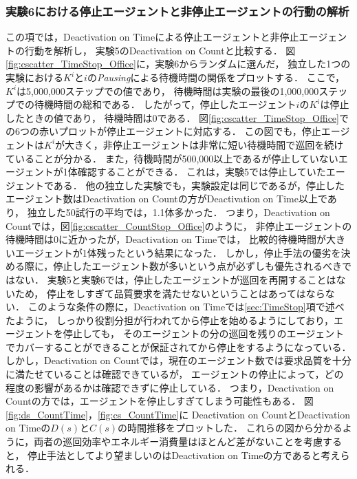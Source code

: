 \documentclass[12pt,a4j,twoside]{jarticle}
\begin{document}
  \subsubsection{実験6における停止エージェントと非停止エージェントの行動の解析}\label{sec:ex6Analsis}
  この項では，Deactivation on Timeによる停止エージェントと非停止エージェントの行動を解析し，
  実験5のDeactivation on Countと比較する．
  図\ref{fig:cscatter_TimeStop_Office}に，実験6からランダムに選んだ，
  独立した1つの実験における$K^i$と$i$の{\em Pausing}による待機時間の関係をプロットする．
  ここで，$K^i$は5,000,000ステップでの値であり，
  待機時間は実験の最後の1,000,000ステップでの待機時間の総和である．
  したがって，停止したエージェント$i$の$K^i$は停止したときの値であり，
  待機時間は0である．
  図\ref{fig:cscatter_TimeStop_Office}での6つの赤いプロットが停止エージェントに対応する．
  この図でも，停止エージェントは$K^i$が大きく，非停止エージェントは非常に短い待機時間で巡回を続けていることが分かる．
  また，待機時間が500,000以上であるが停止していないエージェントが1体確認することができる．
  これは，実験5では停止していたエージェントである．
  他の独立した実験でも，実験設定は同じであるが，停止したエージェント数はDeactivation on Countの方がDeactivation on Time以上であり，
  独立した50試行の平均では，1.1体多かった．
  つまり，Deactivation on Countでは，図\ref{fig:cscatter_CountStop_Office}のように，
  非停止エージェントの待機時間は0に近かったが，Deactivation on Timeでは，
  比較的待機時間が大きいエージェントが1体残ったという結果になった．
  しかし，停止手法の優劣を決める際に，停止したエージェント数が多いという点が必ずしも優先されるべきではない．
  実験5と実験6では，停止したエージェントが巡回を再開することはないため，
  停止をしすぎて品質要求を満たせないということはあってはならない．
  このような条件の際に，Deactivation on Timeでは\ref{sec:TimeStop}項で述べたように，
  しっかり役割分担が行われてから停止を始めるようにしており，エージェントを停止しても，
  そのエージェントの分の巡回を残りのエージェントでカバーすることができることが保証されてから停止をするようになっている．
  しかし，Deactivation on Countでは，現在のエージェント数では要求品質を十分に満たせていることは確認できているが，
  エージェントの停止によって，どの程度の影響があるかは確認できずに停止している．
  つまり，Deactivation on Countの方では，エージェントを停止しすぎてしまう可能性もある．
  図\ref{fig:ds_CountTime}，\ref{fig:cs_CountTime}に
  Deactivation on CountとDeactivation on Timeの$D(s)$と$C(s)$の時間推移をプロットした．
  これらの図から分かるように，両者の巡回効率やエネルギー消費量はほとんど差がないことを考慮すると，
  停止手法としてより望ましいのはDeactivation on Timeの方であると考えられる．
  \par
\end{document}
